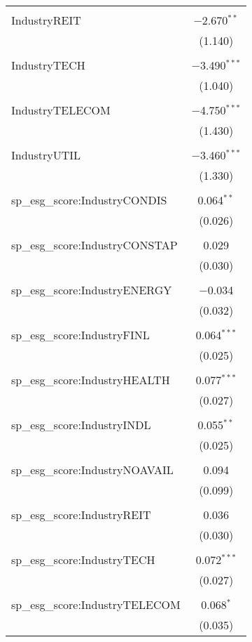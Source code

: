 \begin{table}[!htbp]
\begin{tabular}{@{\extracolsep{5pt}}lc}
  & \\ 
 IndustryREIT & $-$2.670$^{**}$ \\ 
  & (1.140) \\ 
  & \\ 
 IndustryTECH & $-$3.490$^{***}$ \\ 
  & (1.040) \\ 
  & \\ 
 IndustryTELECOM & $-$4.750$^{***}$ \\ 
  & (1.430) \\ 
  & \\ 
 IndustryUTIL & $-$3.460$^{***}$ \\ 
  & (1.330) \\ 
  & \\ 
 sp\_esg\_score:IndustryCONDIS & 0.064$^{**}$ \\ 
  & (0.026) \\ 
  & \\ 
 sp\_esg\_score:IndustryCONSTAP & 0.029 \\ 
  & (0.030) \\ 
  & \\ 
 sp\_esg\_score:IndustryENERGY & $-$0.034 \\ 
  & (0.032) \\ 
  & \\ 
 sp\_esg\_score:IndustryFINL & 0.064$^{***}$ \\ 
  & (0.025) \\ 
  & \\ 
 sp\_esg\_score:IndustryHEALTH & 0.077$^{***}$ \\ 
  & (0.027) \\ 
  & \\ 
 sp\_esg\_score:IndustryINDL & 0.055$^{**}$ \\ 
  & (0.025) \\ 
  & \\ 
 sp\_esg\_score:IndustryNOAVAIL & 0.094 \\ 
  & (0.099) \\ 
  & \\ 
 sp\_esg\_score:IndustryREIT & 0.036 \\ 
  & (0.030) \\ 
  & \\ 
 sp\_esg\_score:IndustryTECH & 0.072$^{***}$ \\ 
  & (0.027) \\ 
  & \\ 
 sp\_esg\_score:IndustryTELECOM & 0.068$^{*}$ \\ 
  & (0.035) \\ 

\end{tabular}
\end{table}
